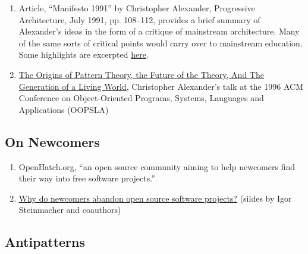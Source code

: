 \begin{enumerate}
\item
  Article, ``Manifesto 1991'' by Christopher Alexander, Progressive
  Architecture, July 1991, pp. 108--112, provides a brief summary of
  Alexander's ideas in the form of a critique of mainstream
  architecture. Many of the same sorts of critical points would carry
  over to mainstream education. Some highlights are excerpted
  \href{https://plus.google.com/u/0/108598104736826154120/posts/agWYcqPhqSN}{here}.

\item \href{http://www.patternlanguage.com/archive/ieee/ieeetext.htm}{The
  Origins of Pattern Theory, the Future of the Theory, And The
  Generation of a Living World}, Christopher Alexander's talk at the
  1996 ACM Conference on Object-Oriented Programs, Systems, Languages
  and Applications (OOPSLA)
\end{enumerate}


\subsection{On Newcomers}

\begin{enumerate}
\item
  OpenHatch.org, ``an open source community aiming to help newcomers
  find their way into free software projects.''
\item
  \href{http://lapessc.ime.usp.br/public/papers/13872/CHASE13\_present.pdf}{Why
  do newcomers abandon open source software projects?} (sildes by Igor
  Steinmacher and coauthors)
\end{enumerate}
\subsection{Antipatterns}

